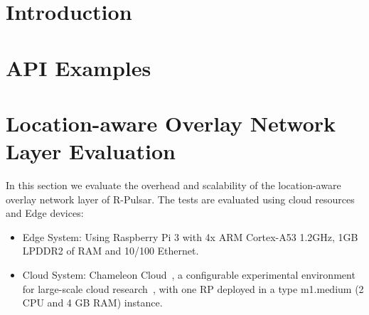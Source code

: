 \section{Introduction}

\section{API Examples}



\section{Location-aware Overlay Network Layer Evaluation}

In this section we evaluate the overhead and scalability of the location-aware overlay network layer of R-Pulsar. The tests are evaluated using cloud resources and Edge devices:

\begin{itemize}
\item Edge System: Using Raspberry Pi 3 with 4x ARM Cortex-A53 1.2GHz, 1GB LPDDR2 of RAM and 10/100 Ethernet.
\item Cloud System: Chameleon Cloud~\cite{chameleon}, a configurable experimental environment for large-scale cloud research~\cite{chameleon}, with one RP deployed in a type m1.medium (2 CPU and 4 GB RAM) instance.
\end{itemize}

